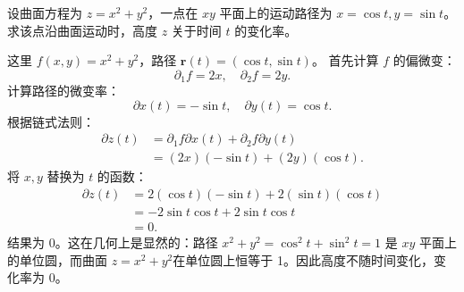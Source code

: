 \documentclass[12pt,UTF8]{ctexbook}
\begin{document}


\begin{et}
设曲面方程为 $z = x^2 + y^2$，一点在 $xy$ 平面上的运动路径为 $x = \cos t, y = \sin t$。求该点沿曲面运动时，高度 $z$ 关于时间 $t$ 的变化率。
\end{et}
\begin{so}
这里 $f(x, y) = x^2 + y^2$，路径 $\mathbf{r}(t) = (\cos t, \sin t)$。
首先计算 $f$ 的偏微变：
$$ \partial_1 f = 2x, \quad \partial_2 f = 2y. $$
计算路径的微变率：
$$ \partial x(t) = -\sin t, \quad \partial y(t) = \cos t. $$
根据链式法则：
\begin{align*}
\partial z(t) &= \partial_1 f \partial x(t) + \partial_2 f \partial y(t) \\
&= (2x)(-\sin t) + (2y)(\cos t).
\end{align*}
将 $x, y$ 替换为 $t$ 的函数：
\begin{align*}
\partial z(t) &= 2(\cos t)(-\sin t) + 2(\sin t)(\cos t) \\
&= -2\sin t \cos t + 2\sin t \cos t \\
&= 0.
\end{align*}
结果为 0。这在几何上是显然的：路径 $x^2 + y^2 = \cos^2 t + \sin^2 t = 1$ 是 $xy$ 平面上的单位圆，而曲面 $z = x^2 + y^2$在单位圆上恒等于 1。因此高度不随时间变化，变化率为 0。
\end{so}
\end{document}
